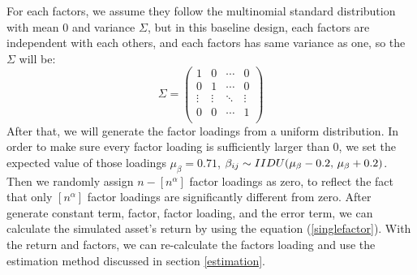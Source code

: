 \documentclass[12pt]{article}
\begin{document}
For each factors, we assume they follow the multinomial standard distribution with mean 0 and variance $\Sigma$, but in this baseline design, each factors are independent with each others, and each factors has same variance as one, so the $\Sigma$ will be:
\[ \Sigma = \begin{pmatrix}
1 & 0 &\cdots  & 0\\
0&1 &\cdots  & 0\\
\vdots & \vdots & \ddots & \vdots \\
0 &0 &\cdots  & 1\\
\end{pmatrix}  \]
After that, we will generate the factor loadings from a uniform distribution.
In order to make sure every factor loading is sufficiently larger than 0, we set the expected value of those loadings  $\mu_{\beta} = 0.71$, $\beta_{ij} \sim \mathnormal{IIDU}(\mu_{\beta}-0.2,\, \mu_{\beta}+0.2)$.
Then we randomly assign $n - [n^\alpha]$ factor loadings as zero, to reflect the fact that only $[n^\alpha]$ factor loadings are significantly different from zero. 
After generate constant term, factor, factor loading, and the error term, we can calculate the simulated asset's return by using the equation (\ref{singlefactor}).
With the return and factors, we can re-calculate the factors loading and use the estimation method discussed in section \ref{estimation}.


\end{document}
